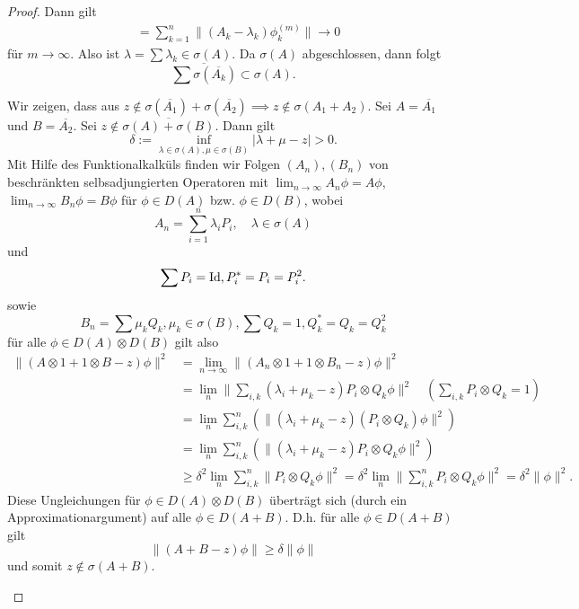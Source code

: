 \documentclass{mycourse}
\begin{document}
\begin{proof}
Dann gilt \fixme
\begin{align*}
&= \sum_{k=1}^n \| (A_k - \lambda_k) \phi^{(m)}_k \| \to 0
\end{align*}
für $m\to \infty$. Also ist $\lambda = \sum \lambda_k \in \sigma(A)$. Da $\sigma(A)$ abgeschlossen, dann folgt
\[
\overline{\sum \sigma (\overline{A_k})} \subset \sigma(A).
\] 
\begin{seg}[Umkehrung für $n=2$]
Wir zeigen, dass aus $z\not\in \sigma(\overline{A_1}) + \sigma(\overline{A_2}) \implies z\not\in \sigma(A_1 + A_2)$. Sei $A= \overline{A_1}$ und $B= \overline{A_2}$. Sei $z\not\in \overline{\sigma(A) + \sigma(B)}$. Dann gilt
\[
\delta := \inf_{\lambda\in \sigma(A), \mu \in \sigma(B)} |\lambda + \mu -z|>0.
\]
Mit Hilfe des Funktionalkalküls finden wir Folgen $(A_n), (B_n)$ von beschränkten selbsadjungierten Operatoren mit $\lim_{n\to \infty} A_n \phi = A \phi$, $\lim_{n\to \infty} B_n \phi = B\phi$ für $\phi \in D(A)$ bzw. $\phi \in D(B)$, wobei
\[
A_n = \sum_{i=1}^n \lambda_i P_i, \quad \lambda \in \sigma(A)
\]
und
\[
\sum P_i = \operatorname{Id}, P_i^* = P_i = P_i^2.
\]
sowie
\[
B_n = \sum \mu_k Q_k, \mu_k \in \sigma(B), \sum Q_k =1, Q_k^* = Q_k = Q_k^2
\]
für alle $\phi \in D(A) \otimes D(B)$ gilt also
\begin{align*}
\| (A \otimes 1 + 1 \otimes B - z) \phi \|^2 &= \lim_{n\to \infty} \| (A_n \otimes 1 + 1 \otimes B_n -z) \phi\|^2 \\
&= \lim_{n} \| \sum_{i,k} (\lambda_i + \mu_k -z)  P_i \otimes Q_k \phi \|^2 \quad (\sum_{i,k} P_i \otimes Q_k =1)\\
&= \lim_{n} \sum_{i,k}^n ( \| (\lambda_i+ \mu_k -z) (P_i \otimes Q_k) \phi\|^2)\\
&= \lim_{n} \sum_{i,k}^n ( \|(\lambda_i + \mu_k-z) P_i \otimes Q_k \phi\|^2)\\
&\ge \delta^2 \lim_{n} \sum_{i,k}^n \|P_i \otimes Q_k \phi \|^2 = \delta^2 \lim_{n} \| \sum_{i,k}^n P_i \otimes Q_k \phi \|^2 = \delta^2 \|\phi \|^2.
\end{align*}
Diese Ungleichungen für $\phi \in D(A) \otimes D(B)$ überträgt sich (durch ein Approximationargument) auf alle $\phi \in D(A+B)$. D.h. für alle $\phi \in D(A+B)$ gilt
\[
\|(A+B-z) \phi \| \ge \delta \| \phi \|
\]
und somit $z\not\in \sigma(A+B)$.
\end{seg} \fixme
\end{proof}
\end{document}
